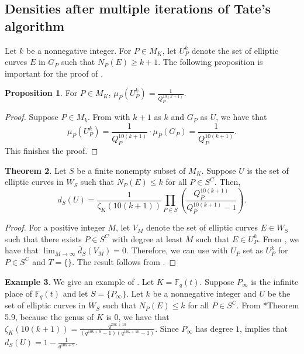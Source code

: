\documentclass[12pt,letterpaper]{amsart}
\theoremstyle{definition}
\newtheorem{theorem}{Theorem}[section]
\newtheorem{proposition}[theorem]{Proposition}
\newtheorem{exmp}[theorem]{Example}
\begin{document}
\subsection{Densities after multiple iterations of Tate's algorithm}

Let $k$ be a nonnegative integer. For $P\in M_K$, let $U_P^k$ denote the set of elliptic curves $E$ in $G_P$ such that $N_P(E)\geq k+1$. The following proposition is important for the proof of .

\begin{proposition}
\label{multiterlocal}
For $P\in M_K$, $\mu_P(U_P^k)=\frac{1}{Q_P^{10(k+1)}}$.
\end{proposition}

\begin{proof}
Suppose $P\in M_k$. From  with $k+1$ as $k$ and $G_P$ as $U$, we have that
\[
\mu_P(U_P^k)=\frac{1}{Q_P^{10(k+1)}}\cdot\mu_P(G_P)=\frac{1}{Q_P^{10(k+1)}}.
\]
This finishes the proof.
\end{proof}

\begin{theorem}
\label{multiterglobal}
Let $S$ be a finite nonempty subset of $M_K$. Suppose $U$ is the set of elliptic curves in $W_S$ such that $N_P(E)\leq k$ for all $P\in S^C$. Then,
\[
d_S(U)=\frac{1}{\zeta_K(10(k+1))}\prod_{P\in S} \left(\frac{Q_P^{10(k+1)}}{Q_P^{10(k+1)}-1}\right).
\]
\end{theorem}

\begin{proof}
For a positive integer $M$, let $V_M$ denote the set of elliptic curves $E\in W_S$ such that there exists $P\in S^C$ with degree at least $M$ such that $E\in U_P^k$. From , we have that $\lim_{M\rightarrow\infty}\overline{d}_S(V_M)=0$. Therefore, we can use  with $U_P$ set as $U_P^k$ for $P\in S^C$ and $T=\{\}$. The result follows from .
\end{proof}

\begin{exmp}
We give an example of . Let $K=\mathbb{F}_q(t)$. Suppose $P_\infty$ is the infinite place of $\mathbb{F}_q(t)$ and let $S=\{P_\infty\}$. Let $k$ be a nonnegative integer and $U$ be the set of elliptic curves in $W_S$ such that $N_P(E)\leq k$ for all $P\in S^C$. From \cite{NTFunc}*{Theorem 5.9}, because the genus of $K$ is $0$, we have that $\zeta_K(10(k+1))=\frac{q^{20k+19}}{(q^{10k+9}-1)(q^{10k+10}-1)}$. Since $P_\infty$ has degree $1$,  implies that $d_S(U)=1-\frac{1}{q^{10k+9}}$.
\end{exmp}
\end{document}
